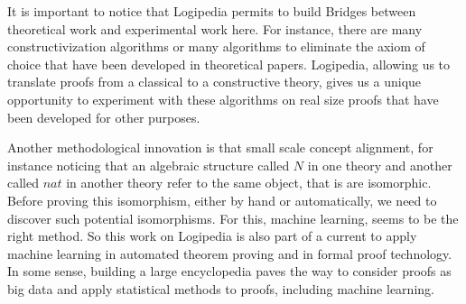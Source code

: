 It is important to notice that Logipedia permits to build Bridges
between theoretical work and experimental work here. For instance,
there are many constructivization algorithms or many algorithms to
eliminate the axiom of choice that have been developed in theoretical
papers. Logipedia, allowing us to translate proofs from a classical to
a constructive theory, gives us a unique opportunity to experiment
with these algorithms on real size proofs that have been developed for
other purposes.

Another methodological innovation is that small scale concept
alignment, for instance noticing that an algebraic structure called
$N$ in one theory and another called $nat$ in another theory refer to
the same object, that is are isomorphic. Before proving this
isomorphism, either by hand or automatically, we need to discover such
potential isomorphisms. For this, machine learning, seems to be the
right method. So this work on Logipedia is also part of a current to
apply machine learning in automated theorem proving and in formal
proof technology. In some sense, building a large encyclopedia paves
the way to consider proofs as big data and apply statistical methods to 
proofs, including machine learning.

